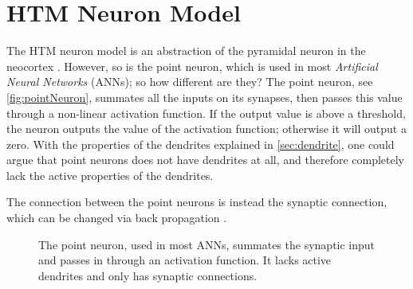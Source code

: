 \section{HTM Neuron Model}
The HTM neuron model is an abstraction of the pyramidal neuron in the neocortex \cite{10.3389/fncir.2016.00023}. However, so is the point neuron, which is used in most \textit{Artificial Neural Networks} (ANNs); so how different are they? The point neuron, see \autoref{fig:pointNeuron}, summates all the inputs on its synapses, then passes this value through a non-linear activation function. If the output value is above a threshold, the neuron outputs the value of the activation function; otherwise it will output a zero. With the properties of the dendrites explained in \autoref{sec:dendrite}, one could argue that point neurons does not have dendrites at all, and therefore completely lack the active properties of the dendrites. 


The connection between the point neurons is instead the synaptic connection, which can be changed via back propagation \cite{LeCunYann2015Dl}. 

\begin{figure}[ht!]
    \centering
    
    \caption{The point neuron, used in most ANNs, summates the synaptic input and passes in through an activation function. It lacks active dendrites and only has synaptic connections.} %
    \label{fig:pointNeuron}
\end{figure}


